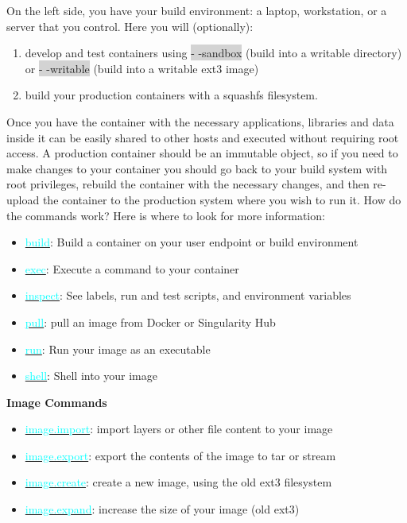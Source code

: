 \documentclass[a4paper]{article}
\newcounter{subsubsubsection}[subsubsection]
\begin{document}
On the left side, you have your build environment: a laptop, workstation, or a server that you control. Here you will (optionally):
\\
\begin{enumerate}
\item develop and test containers using \colorbox{lightgray}{- -sandbox} (build into a writable directory) or  \colorbox{lightgray}{- -writable} (build into a writable ext3 image)
\item build your production containers with a squashfs filesystem.
\end{enumerate}
Once you have the container with the necessary applications, libraries and data inside it can be easily shared to other hosts and executed without requiring root access. A production container should be an immutable object, so if you need to make changes to your container you should go back to your build system with root privileges, rebuild the container with the necessary changes, and then re-upload the container to the production system where you wish to run it.
How do the commands work? Here is where to look for more information:
\\[0.1in]
\begin{itemize}
\item \hyperref[sec:build]{{\textcolor{cyan}{build}}}: Build a container on your user endpoint or build environment
\item \hyperref[sec:exec]{{\textcolor{cyan}{exec}}}: Execute a command to your container
\item \hyperref[sec:inspect]{{\textcolor{cyan}{inspect}}}: See labels, run and test scripts, and environment variables
\item \hyperref[sec:pull]{{\textcolor{cyan}{pull}}}: pull an image from Docker or Singularity Hub
\item \hyperref[sec:run]{{\textcolor{cyan}{run}}}: Run your image as an executable
\item \hyperref[sec:shell]{{\textcolor{cyan}{shell}}}: Shell into your image
\end{itemize}


\noindent\textbf{Image Commands}

\begin{itemize}
\item \hyperref[sec:imageimport]{{\textcolor{cyan}{image.import}}}: import layers or other file content to your image
\item \hyperref[sec:imageexport]{{\textcolor{cyan}{image.export}}}: export the contents of the image to tar or stream
\item \hyperref[sec:imagecreate]{{\textcolor{cyan}{image.create}}}: create a new image, using the old ext3 filesystem
\item \hyperref[sec:imageexpand]{{\textcolor{cyan}{image.expand}}}: increase the size of your image (old ext3)
\end{itemize}
\end{document}
